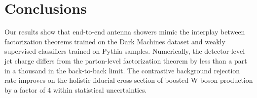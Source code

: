 \section{Conclusions}\label{sec:conclusions}

Our results show that end-to-end antenna showers mimic the interplay
between factorization theorems trained on the Dark Machines dataset and
weakly supervised classifiers trained on Pythia samples. Numerically,
the detector-level jet charge differs from the parton-level
factorization theorem by less than a part in a thousand in the
back-to-back limit. The contrastive background rejection rate improves
on the holistic fiducial cross section of boosted W boson production by
a factor of 4 within statistical uncertainties.

